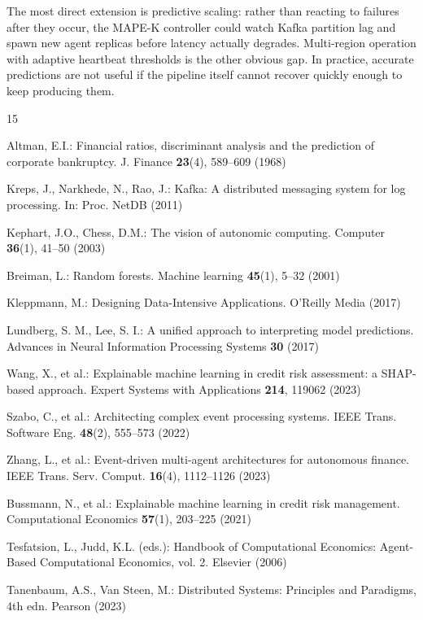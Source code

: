 \documentclass[runningheads]{llncs}
\begin{document}
The most direct extension is predictive scaling: rather than reacting to failures after they occur, the MAPE-K controller could watch Kafka partition lag and spawn new agent replicas before latency actually degrades. Multi-region operation with adaptive heartbeat thresholds is the other obvious gap. In practice, accurate predictions are not useful if the pipeline itself cannot recover quickly enough to keep producing them.

\begin{thebibliography}{15}

Altman, E.I.: Financial ratios, discriminant analysis and the prediction of corporate bankruptcy. J. Finance \textbf{23}(4), 589--609 (1968)

Kreps, J., Narkhede, N., Rao, J.: Kafka: A distributed messaging system for log processing. In: Proc. NetDB (2011)

Kephart, J.O., Chess, D.M.: The vision of autonomic computing. Computer \textbf{36}(1), 41--50 (2003)

Breiman, L.: Random forests. Machine learning \textbf{45}(1), 5--32 (2001)

Kleppmann, M.: Designing Data-Intensive Applications. O'Reilly Media (2017)

Lundberg, S. M., Lee, S. I.: A unified approach to interpreting model predictions. Advances in Neural Information Processing Systems \textbf{30} (2017)

Wang, X., et al.: Explainable machine learning in credit risk assessment: a SHAP-based approach. Expert Systems with Applications \textbf{214}, 119062 (2023)

Szabo, C., et al.: Architecting complex event processing systems. IEEE Trans. Software Eng. \textbf{48}(2), 555--573 (2022)

Zhang, L., et al.: Event-driven multi-agent architectures for autonomous finance. IEEE Trans. Serv. Comput. \textbf{16}(4), 1112--1126 (2023)

Bussmann, N., et al.: Explainable machine learning in credit risk management. Computational Economics \textbf{57}(1), 203--225 (2021)

Tesfatsion, L., Judd, K.L. (eds.): Handbook of Computational Economics: Agent-Based Computational Economics, vol. 2. Elsevier (2006)

Tanenbaum, A.S., Van Steen, M.: Distributed Systems: Principles and Paradigms, 4th edn. Pearson (2023)

\end{thebibliography}
\end{document}

